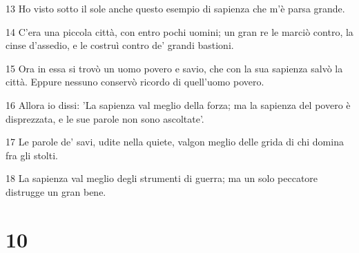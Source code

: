 \par 13 Ho visto sotto il sole anche questo esempio di sapienza che m'è parsa grande.
\par 14 C'era una piccola città, con entro pochi uomini; un gran re le marciò contro, la cinse d'assedio, e le costruì contro de' grandi bastioni.
\par 15 Ora in essa si trovò un uomo povero e savio, che con la sua sapienza salvò la città. Eppure nessuno conservò ricordo di quell'uomo povero.
\par 16 Allora io dissi: 'La sapienza val meglio della forza; ma la sapienza del povero è disprezzata, e le sue parole non sono ascoltate'.
\par 17 Le parole de' savi, udite nella quiete, valgon meglio delle grida di chi domina fra gli stolti.
\par 18 La sapienza val meglio degli strumenti di guerra; ma un solo peccatore distrugge un gran bene.

\chapter{10}

